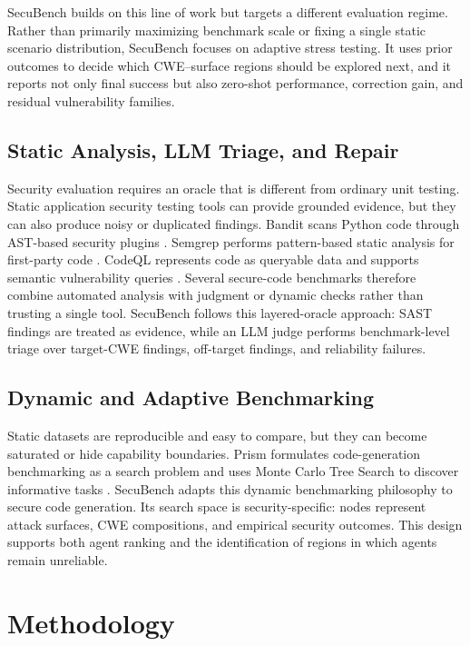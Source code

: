 \documentclass[11pt]{article}
\newcommand{\toolname}{SecuBench}
\begin{document}
\toolname{} builds on this line of work but targets a different evaluation regime. Rather than primarily maximizing benchmark scale or fixing a single static scenario distribution, \toolname{} focuses on adaptive stress testing. It uses prior outcomes to decide which CWE--surface regions should be explored next, and it reports not only final success but also zero-shot performance, correction gain, and residual vulnerability families.

\subsection{Static Analysis, LLM Triage, and Repair}

Security evaluation requires an oracle that is different from ordinary unit testing. Static application security testing tools can provide grounded evidence, but they can also produce noisy or duplicated findings. Bandit scans Python code through AST-based security plugins \cite{bandit}. Semgrep performs pattern-based static analysis for first-party code \cite{semgrep}. CodeQL represents code as queryable data and supports semantic vulnerability queries \cite{codeql}. Several secure-code benchmarks therefore combine automated analysis with judgment or dynamic checks rather than trusting a single tool. \toolname{} follows this layered-oracle approach: SAST findings are treated as evidence, while an LLM judge performs benchmark-level triage over target-CWE findings, off-target findings, and reliability failures.

\subsection{Dynamic and Adaptive Benchmarking}

Static datasets are reproducible and easy to compare, but they can become saturated or hide capability boundaries. Prism formulates code-generation benchmarking as a search problem and uses Monte Carlo Tree Search to discover informative tasks \cite{majdinasab2025prism}. \toolname{} adapts this dynamic benchmarking philosophy to secure code generation. Its search space is security-specific: nodes represent attack surfaces, CWE compositions, and empirical security outcomes. This design supports both agent ranking and the identification of regions in which agents remain unreliable.

\section{Methodology}
\end{document}
